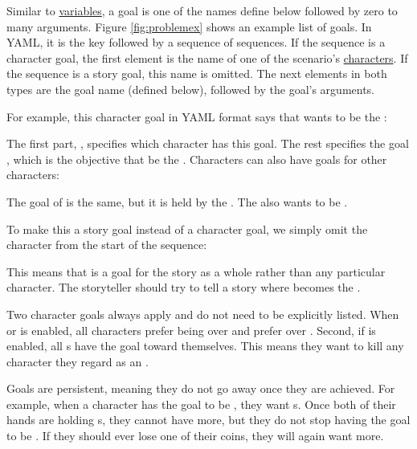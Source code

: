 \documentclass{nilreport}
\begin{document}
Similar to \hyperref[sec:variables]{variables}, a goal is one of the names define below followed by zero to many arguments. Figure \ref{fig:problemex} shows an example list of goals. In YAML, it is the key  followed by a sequence of sequences. If the sequence is a character goal, the first element is the name of one of the scenario's \hyperref[sec:characters]{characters}. If the sequence is a story goal, this name is omitted. The next elements in both types are the goal name (defined below), followed by the goal's arguments.

For example, this character goal in YAML format says that  wants  to be the :

\centerline{}

\noindent The first part, , specifies which character has this goal. The rest specifies the goal , which is the objective that  be the . Characters can also have goals for other characters:

\centerline{}

\noindent The goal of  is the same, but it is held by the . The  also wants  to be .

To make this a story goal instead of a character goal, we simply omit the character from the start of the sequence:

\centerline{}

\noindent This means that  is a goal for the story as a whole rather than any particular character. The storyteller should try to tell a story where  becomes the .

Two character goals always apply and do not need to be explicitly listed. When  or  is enabled, all characters prefer being  over  and prefer  over . Second, if  is enabled, all s have the  goal toward themselves. This means they want to kill any character they regard as an .

Goals are persistent, meaning they do not go away once they are achieved. For example, when a character has the goal to be , they want s. Once both of their hands are holding s, they cannot have more, but they do not stop having the goal to be . If they should ever lose one of their coins, they will again want more.
\end{document}
